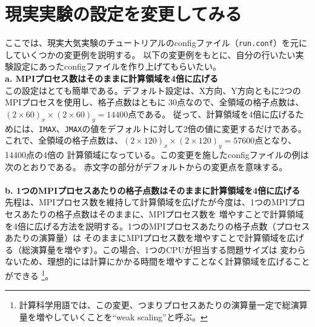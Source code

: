 \section{現実実験の設定を変更してみる}
ここでは、現実大気実験のチュートリアルのconfigファイル（\verb|run.conf|）を元にしていくつかの変更例を説明する。
以下の変更例をもとに、自分の行いたい実験設定にあったconfigファイルを作り上げてもらいたい。\\


{\bf a. MPIプロセス数はそのままに計算領域を4倍に広げる}\\

この設定はとても簡単である。デフォルト設定は、X方向、Y方向ともに2つのMPIプロセスを使用し、格子点数はともに
30点なので、全領域の格子点数は、$(2 \times 60)_{x} \times (2 \times 60)_{y} = 14400$点である。
従って、計算領域を4倍に広げるためには、\verb|IMAX|、\verb|JMAX|の値をデフォルトに対して2倍の値に変更するだけである。
これで、全領域の格子点数は、$(2 \times 120)_{x} \times (2 \times 120)_{y} = 57600$点となり、14400点の4倍の
計算領域になっている。この変更を施したconfigファイルの例は次のとおりである。
赤文字の部分がデフォルトからの変更点を意味する。\\

\\

\vspace{5mm}
{\bf b. 1つのMPIプロセスあたりの格子点数はそのままに計算領域を4倍に広げる}\\

先程は、MPIプロセス数を維持して計算領域を広げたが今度は、1つのMPIプロセスあたりの格子点数はそのままに、MPIプロセス数を
増やすことで計算領域を4倍に広げる方法を説明する。1つのMPIプロセスあたりの格子点数（プロセスあたりの演算量）は
そのままにMPIプロセス数を増やすことで計算領域を広げる（総演算量を増やす）。この場合、1つのCPUが担当する問題サイズは
変わらないため、理想的には計算にかかる時間を増やすことなく計算領域を広げることができる
\footnote{計算科学用語では、この変更、つまりプロセスあたりの演算量一定で総演算量を増やしていくことを``weak scaling''と呼ぶ。}。

